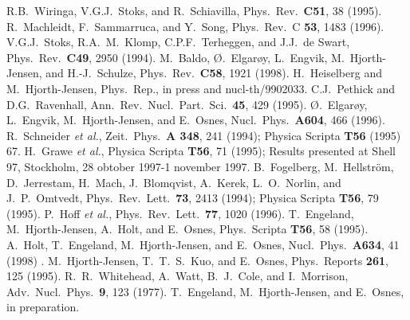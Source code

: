\documentclass{ws-p9-75x6-50}
\begin{document}
\begin{thebibliography}{99}
 R.B.\ Wiringa, V.G.J.\ Stoks, and R.\ Schiavilla, 
Phys.\ Rev.\ {\bf C51}, 38 (1995).
     R.\ Machleidt, F.\ Sammarruca, and Y.\ Song,
                     Phys.\ Rev.\ C {\bf 53}, 1483  (1996).
 V.G.J.\ Stoks, R.A.\ M.\ Klomp, C.P.F.\ Terheggen, 
and J.J.\
de Swart, Phys.\ Rev.\ {\bf C49}, 2950  (1994).
 M.\ Baldo, \O.\ Elgar\o y, L.\ Engvik, 
                  M.\ Hjorth-Jensen, and H.-J.\ Schulze,
                  Phys.\ Rev.\ {\bf C58}, 1921 (1998).
 H.\ Heiselberg and M.\ Hjorth-Jensen, Phys.\ Rep., in press
                 and nucl-th/9902033.
 C.J.\ Pethick and D.G.\ Ravenhall, 
Ann.\ Rev.\ Nucl.\ Part.\ Sci.\ {\bf 45}, 429 (1995).
 \O.\ Elgar\o y, L.\ Engvik, 
                  M.\ Hjorth-Jensen, and E.\ Osnes, 
                  Nucl.\ Phys.\ {\bf A604}, 466 (1996).
R.\ Schneider {\em et al.}, 
                     Zeit.\ Phys.\ {\bf A 348}, 241 (1994);
                     Physica Scripta {\bf T56}  (1995) 67.
    H.\ Grawe {\em et al.}, 
                     Physica Scripta {\bf T56}, 71 (1995); Results presented
                     at Shell 97, Stockholm, 28 obtober 1997-1 november 1997.
\bibitem{fog94}      B.\ Fogelberg, M.\ Hellstr\"{o}m, D.\ Jerrestam, H.\ Mach,
                     J.\ Blomqvist, A.\ Kerek, L.\ O.\ Norlin, and 
                     J.\ P.\ Omtvedt, 
                     Phys.\ Rev.\ Lett.\ {\bf 73}, 2413  (1994); 
                     Physica Scripta {\bf T56},  79 (1995).
     P.\ Hoff {\em et al.}, 
                     Phys.\ Rev.\ Lett.\ {\bf 77}, 1020 (1996).
     T.\ Engeland, M.\ Hjorth-Jensen, A.\ Holt, and E.\ Osnes,
                     Phys.\ Scripta {\bf T56}, 58  (1995).
     A.\ Holt, T.\ Engeland, M.\ Hjorth-Jensen, and E.\ Osnes,
                     Nucl.\ Phys.\ {\bf A634}, 41 (1998) .
  M.\ Hjorth-Jensen, T.\ T.\ S.\ Kuo, and
E.\ Osnes, Phys.\ Reports {\bf 261}, 125 (1995).
     R.\ R.\ Whitehead, A.\ Watt, B.\ J.\ Cole, and I.\
                     Morrison, 
                     Adv.\ Nucl.\ Phys.\ {\bf 9}, 123 (1977).
\bibitem{eho2000} T.\ Engeland, M.\ Hjorth-Jensen, and E.\ Osnes, in preparation. 

\end{thebibliography}
\end{document}
